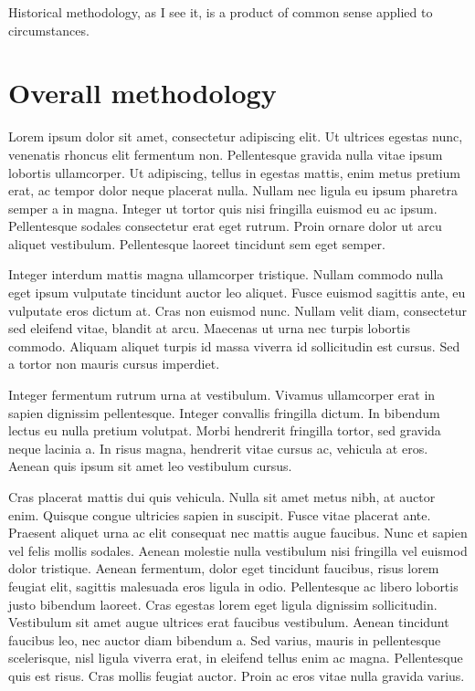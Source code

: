 

\begin{savequote}[50mm]
Historical methodology, as I see it, is a product of common sense applied to circumstances. 
\end{savequote}


\chapter{Overall methodology}
\label{cha:Overall methodology}



\cite{turing1950computing}

Lorem ipsum dolor sit amet, consectetur adipiscing elit. Ut ultrices egestas nunc, venenatis rhoncus elit fermentum non. Pellentesque gravida nulla vitae ipsum lobortis ullamcorper. Ut adipiscing, tellus in egestas mattis, enim metus pretium erat, ac tempor dolor neque placerat nulla. Nullam nec ligula eu ipsum pharetra semper a in magna. Integer ut tortor quis nisi fringilla euismod eu ac ipsum. Pellentesque sodales consectetur erat eget rutrum. Proin ornare dolor ut arcu aliquet vestibulum. Pellentesque laoreet tincidunt sem eget semper.

Integer interdum mattis magna ullamcorper tristique. Nullam commodo nulla eget ipsum vulputate tincidunt auctor leo aliquet. Fusce euismod sagittis ante, eu vulputate eros dictum at. Cras non euismod nunc. Nullam velit diam, consectetur sed eleifend vitae, blandit at arcu. Maecenas ut urna nec turpis lobortis commodo. Aliquam aliquet turpis id massa viverra id sollicitudin est cursus. Sed a tortor non mauris cursus imperdiet.

Integer fermentum rutrum urna at vestibulum. Vivamus ullamcorper erat in sapien dignissim pellentesque. Integer convallis fringilla dictum. In bibendum lectus eu nulla pretium volutpat. Morbi hendrerit fringilla tortor, sed gravida neque lacinia a. In risus magna, hendrerit vitae cursus ac, vehicula at eros. Aenean quis ipsum sit amet leo vestibulum cursus.

Cras placerat mattis dui quis vehicula. Nulla sit amet metus nibh, at auctor enim. Quisque congue ultricies sapien in suscipit. Fusce vitae placerat ante. Praesent aliquet urna ac elit consequat nec mattis augue faucibus. Nunc et sapien vel felis mollis sodales. Aenean molestie nulla vestibulum nisi fringilla vel euismod dolor tristique. Aenean fermentum, dolor eget tincidunt faucibus, risus lorem feugiat elit, sagittis malesuada eros ligula in odio. Pellentesque ac libero lobortis justo bibendum laoreet. Cras egestas lorem eget ligula dignissim sollicitudin. Vestibulum sit amet augue ultrices erat faucibus vestibulum. Aenean tincidunt faucibus leo, nec auctor diam bibendum a. Sed varius, mauris in pellentesque scelerisque, nisl ligula viverra erat, in eleifend tellus enim ac magna. Pellentesque quis est risus. Cras mollis feugiat auctor. Proin ac eros vitae nulla gravida varius.

